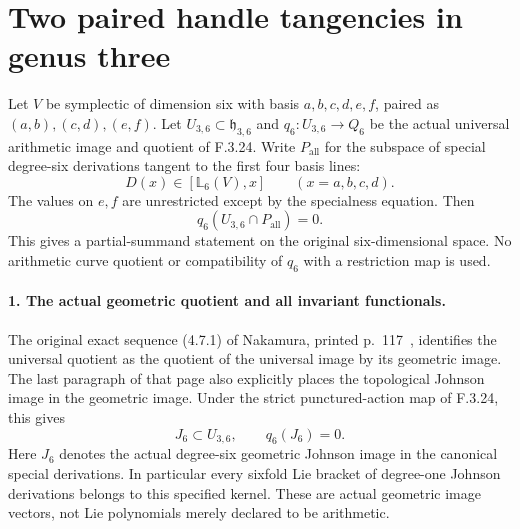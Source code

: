 \section*{Two paired handle tangencies in genus three}

Let $V$ be symplectic of dimension six with basis
$a,b,c,d,e,f$, paired as $(a,b),(c,d),(e,f)$.
Let $U_{3,6}\subset\mathfrak h_{3,6}$ and
$q_6:U_{3,6}\to Q_6$ be the actual universal
arithmetic image and quotient of F.3.24.
Write $P_{\mathrm{all}}$ for the subspace of
special degree-six derivations tangent to the
first four basis lines:
\[
 D(x)\in[\mathbb L_6(V),x]\qquad(x=a,b,c,d).
\]
The values on $e,f$ are unrestricted except by
the specialness equation. Then
\[
                         q_6(U_{3,6}\cap P_{\mathrm{all}})=0.
                                                               \tag{PT.1}
\]
This gives a partial-summand statement on the original
six-dimensional space. No arithmetic curve quotient
or compatibility of $q_6$ with a restriction map is used.

\paragraph{1. The actual geometric quotient and all invariant functionals.}
The original exact sequence (4.7.1) of Nakamura,
printed p.~117~\cite{AuditNakamura1996}, identifies the universal quotient
as the quotient of the universal image by its
geometric image. The last paragraph of that page
also explicitly places the topological Johnson
image in the geometric image. Under the strict
punctured-action map of F.3.24, this gives
\[
                    J_6\subset U_{3,6},\qquad q_6(J_6)=0.
                                                               \tag{PT.2}
\]
Here $J_6$ denotes the actual degree-six geometric
Johnson image in the canonical special derivations.
In particular every sixfold Lie bracket of
degree-one Johnson derivations belongs to this
specified kernel. These are actual geometric
image vectors, not Lie polynomials merely
declared to be arithmetic.


